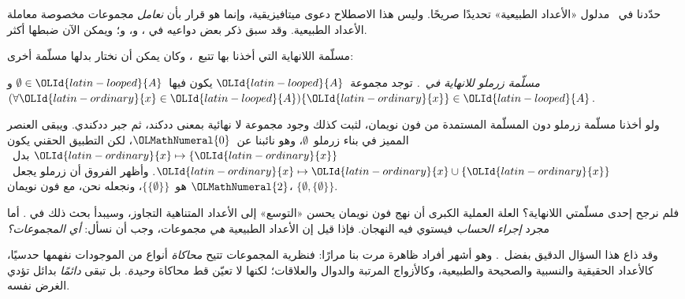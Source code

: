 \documentclass[../../../include/open-logic-section]{subfiles}
\begin{document}
	


حدّدنا في~ مدلول «الأعداد الطبيعية»
تحديدًا صريحًا. وليس هذا الاصطلاح دعوى ميتافيزيقية، وإنما هو قرار بأن
\emph{نعامل} مجموعات مخصوصة معاملة الأعداد الطبيعية. وقد سبق ذكر بعض
دواعيه في
، و،
و؛ ويمكن الآن ضبطها أكثر.

مسلّمة اللانهاية التي أخذنا بها تتبع~\citet{VonNeumann1925}، وكان
يمكن أن نختار بدلها مسلّمة أخرى:

\begin{defish}
\emph{مسلّمة زرملو للانهاية في~\citeyear{Zermelo1908Untersuchungen}.}
توجد مجموعة~${\OLId{latin-looped}{A}}$ يكون فيها~$\emptyset \in {\OLId{latin-looped}{A}}$ و
$(\forall {\OLId{latin-ordinary}{x}} \in {\OLId{latin-looped}{A}})\{{\OLId{latin-ordinary}{x}}\} \in {\OLId{latin-looped}{A}}$.
\end{defish}

ولو أخذنا مسلّمة زرملو دون المسلّمة المستمدة من فون نويمان، لثبت كذلك
وجود مجموعة لا نهائية بمعنى ددكند، ثم جبر ددكندي. ويبقى العنصر المميز
في بناء زرملو~$\emptyset$، وهو نائبنا عن~${\OLMathNumeral{0}}$، لكن التطبيق الحقني يكون
${\OLId{latin-ordinary}{x}} \mapsto \{{\OLId{latin-ordinary}{x}}\}$ بدل~${\OLId{latin-ordinary}{x}} \mapsto {\OLId{latin-ordinary}{x}} \cup \{{\OLId{latin-ordinary}{x}}\}$. وأظهر الفروق أن
زرملو يجعل~${\OLMathNumeral{2}}$ هو~$\{\{\emptyset\}\}$، ونجعله نحن، مع فون نويمان،
$\{\emptyset, \{\emptyset\}\}$.

فلم نرجح إحدى مسلّمتي اللانهاية؟ العلة العملية الكبرى أن نهج فون
نويمان يحسن «التوسع» إلى الأعداد المتناهية التجاوز، وسيبدأ بحث ذلك في
. أما مجرد \emph{إجراء الحساب} فيستوي فيه
النهجان. فإذا قيل إن الأعداد الطبيعية \emph{هي} مجموعات، وجب أن نسأل:
\emph{أي المجموعات؟}

وقد ذاع هذا السؤال الدقيق بفضل~\citet{Benacerraf1965}. وهو أشهر أفراد
ظاهرة مرت بنا مرارًا: فنظرية المجموعات تتيح \emph{محاكاة} أنواع من
الموجودات نفهمها حدسيًا، كالأعداد الحقيقية والنسبية والصحيحة والطبيعية،
وكالأزواج المرتبة والدوال والعلاقات؛ لكنها لا تعيّن قط محاكاة
\emph{وحيدة}. بل تبقى \emph{دائمًا} بدائل تؤدي الغرض نفسه.
\end{document}
